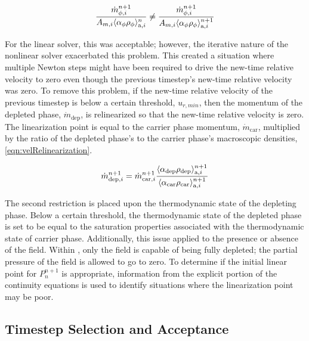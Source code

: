 \begin{equation}
\label{eqn:compareVelocities}
\frac{\dot{m}^{n+1}_{\phi, i}}{A_{m, i} \ave{\alpha_{\phi} \rho_{\phi}}^{n}_{\text{a}, i}} \neq \frac{\dot{m}^{n+1}_{\phi, i}}{A_{m, i} \ave{\alpha_{\phi} \rho_{\phi}}^{n+1}_{\text{a}, i}}
\end{equation}

For the linear solver, this was acceptable; however, the iterative nature of the nonlinear solver exacerbated this problem.
This created a situation where multiple Newton steps might have been required to drive the new-time relative velocity to zero even though the previous timestep's new-time relative velocity was zero.
To remove this problem, if the new-time relative velocity of the previous timestep is below a certain threshold, $u_{r, min}$, then the momentum of the depleted phase, $\dot{m}_{\text{dep}}$, is relinearized so that the new-time relative velocity is zero.
The linearization point is equal to the carrier phase momentum, $\dot{m}_{\text{car}}$, multiplied by the ratio of the depleted phase's to the carrier phase's macroscopic densities, \eqref{eqn:velRelinearization}.

\begin{equation}
\label{eqn:velRelinearization}
\dot{m}^{n+1}_{\text{dep}, i} = \dot{m}^{n+1}_{\text{car}, i} \frac{\ave{\alpha_{\text{dep}} \rho_{\text{dep}}}^{n+1}_{\text{a}, i}}{\ave{\alpha_{\text{car}} \rho_{\text{car}}}^{n+1}_{\text{a}, i}}
\end{equation}

The second restriction is placed upon the thermodynamic state of the depleting phase.
Below a certain threshold, the thermodynamic state of the depleted phase is set to be equal to the saturation properties associated with the thermodynamic state of carrier phase.
Additionally, this issue applied to the presence or absence of the \ncg{} field.
Within \cobra{}, only the \ncg{} field is capable of being fully depleted; the partial pressure of the \ncg{} field is allowed to go to zero.
To determine if the initial linear point for $P^{n+1}_{n}$ is appropriate, information from the explicit portion of the continuity equations is used to identify situations where the linearization point may be poor.

\subsection{Timestep Selection and Acceptance}
\label{subsect:nlnTimesteps}

